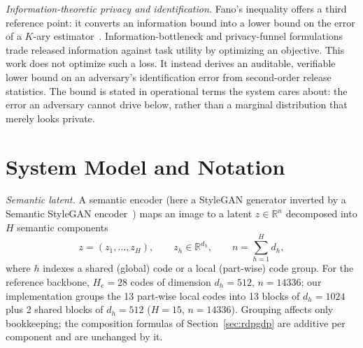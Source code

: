 \documentclass[10pt,twocolumn,letterpaper]{article}
\theoremstyle{plain}
\theoremstyle{definition}
\begin{document}
\emph{Information-theoretic privacy and identification.} Fano's inequality offers a third reference point: it converts an information bound
into a lower bound on the error of a $K$-ary estimator~\cite{fano}. Information-bottleneck and
privacy-funnel formulations~\cite{privacyfunnel} trade released information against task utility by
optimizing an objective. This work does not optimize such a loss. It instead derives an
auditable, verifiable lower bound on an adversary's identification error from
second-order release statistics. The bound is stated in operational terms the system
cares about: the error an adversary cannot drive below, rather than a marginal
distribution that merely looks private.

\section{System Model and Notation}
\label{sec:setup}

\emph{Semantic latent.} A semantic encoder (here a StyleGAN generator inverted
by a Semantic StyleGAN encoder~\cite{semanticstylegan}) maps an image to a
latent $z\in\mathbb{R}^{n}$ decomposed into $H$ semantic components
\begin{equation}
 z=(z_1,\dots,z_H),\qquad z_h\in\mathbb{R}^{d_h},\qquad
 n=\textstyle\sum_{h=1}^{H} d_h ,
\label{eq:decomp}
\end{equation}
where $h$ indexes a shared (global) code or a local (part-wise) code group.
For the reference backbone, $H_{\mathrm c}=28$ codes of dimension
$d_h=512$, $n=14336$; our implementation groups the 13 part-wise local codes
into 13 blocks of $d_h=1024$ plus 2 shared blocks of $d_h=512$ ($H=15$,
$n=14336$). Grouping affects only bookkeeping; the composition formulas of
Section~\ref{sec:rdpgdp} are additive per component and are unchanged by it.
\end{document}
